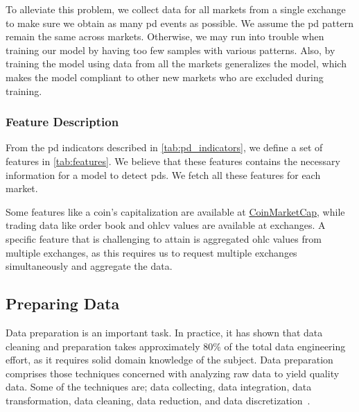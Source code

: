 To alleviate this problem, we collect data for all markets from a single exchange to make sure we obtain as many \ac{pd} events as possible. We assume the \ac{pd} pattern remain the same across markets. Otherwise, we may run into trouble when training our model by having too few samples with various patterns. Also, by training the model using data from all the markets generalizes the model, which makes the model compliant to other new markets who are excluded during training.


\subsubsection{Feature Description}
From the \ac{pd} indicators described in \autoref{tab:pd_indicators}, we define a set of features in \autoref{tab:features}. We believe that these features contains the necessary information for a model to detect \acp{pd}. We fetch all these features for each market.

Some features like a coin's capitalization are available at \href{https://coinmarketcap.com/}{CoinMarketCap}, while trading data like order book and \ac{ohlcv} values are available at exchanges. A specific feature that is challenging to attain is aggregated \ac{ohlc} values from multiple exchanges, as this requires us to request multiple exchanges simultaneously and aggregate the data.



\subsection{Preparing Data}\label{sec:prep}
Data preparation is an important task. In practice, it has shown that data cleaning and preparation takes approximately $80\%$ of the total data engineering effort, as it requires solid domain knowledge of the subject. Data preparation comprises those techniques concerned with analyzing raw data to yield quality data. Some of the techniques are; data collecting, data integration, data transformation, data cleaning, data reduction, and data discretization~\cite{zhang2003data}.


